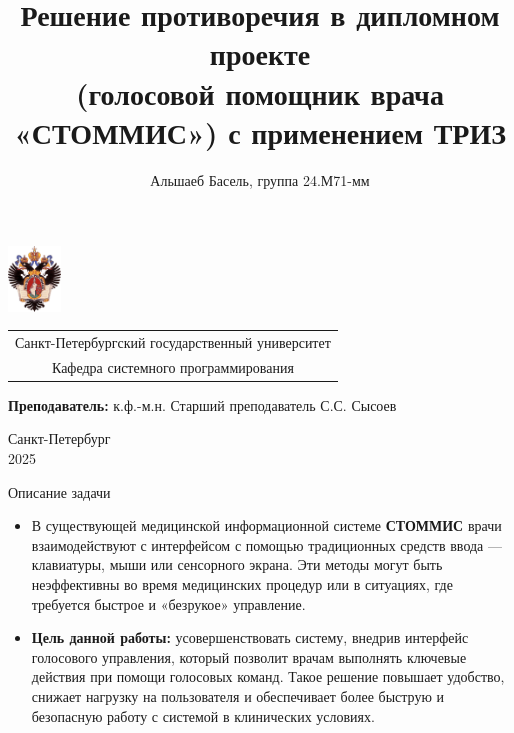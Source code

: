 \documentclass[aspectratio=169]{beamer}
\title[TRIZ для голосового помощника врача]{Решение противоречия в дипломном проекте\\(голосовой помощник врача «СТОММИС») с применением ТРИЗ}
\institute[СПбГУ]{\\ Курс ТРИЗ»}
\author[Альшаеб Басель]{Альшаеб Басель, группа 24.М71-мм}
\begin{document}
{
\begin{frame}
  \includegraphics[width=1.4cm]{pictures/SPbGU_Logo.png}
\vspace{-35pt}
\hspace{-10pt}
\begin{center}
   \begin{tabular}{c}
        \scriptsize{Санкт-Петербургский государственный университет} \\
        \scriptsize{Кафедра системного программирования}
    \end{tabular}
\titlepage
\end{center}

\btVFill

{\scriptsize
   \textbf{Преподаватель:} к.ф.-м.н. Старший преподаватель С.С. Сысоев \\
 }
\begin{center}
  \vspace{5pt}
  \scriptsize{Санкт-Петербург\\
                 2025}
  \end{center}

\end{frame}
}

\begin{frame}{Описание задачи}
  \begin{itemize}
    \item В существующей медицинской информационной системе \textbf{СТОММИС} врачи взаимодействуют с интерфейсом с помощью традиционных средств ввода — клавиатуры, мыши или сенсорного экрана.
    Эти методы могут быть неэффективны во время медицинских процедур или в ситуациях, где требуется быстрое и «безрукое» управление.
    \item \textbf{Цель данной работы:} усовершенствовать систему, внедрив интерфейс голосового управления, который позволит врачам выполнять ключевые действия при помощи голосовых команд.
    Такое решение повышает удобство, снижает нагрузку на пользователя и обеспечивает более быструю и безопасную работу с системой в клинических условиях.
  \end{itemize}
  \bigskip
\end{frame}
\end{document}
